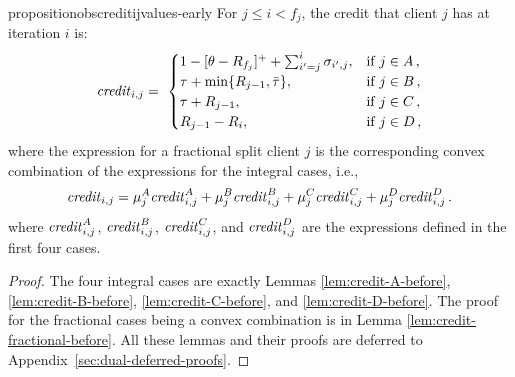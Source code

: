 \begin{restatable}{proposition}{obscreditijvalues-early}\label{prop:credit-ij-values-early}
    For $j \leq i < f_j$, the credit that client $j$ has at iteration $i$ is:
    \begin{equation*}
        \text{\emph{credit}}_{i,j} = 
        \ \begin{cases}
            1 - [\theta - R_{f_j}]^+ + \sum_{i'=j}^i \sigma_{i',j}, 
            & \text{if $j \in A$}\,,\\
            \tau + \min\{R_{j-1},\bar\tau\}, 
            & \text{if $j \in B$}\,,\\
            \tau + R_{j-1}, 
            & \text{if $j \in C$}\,,\\
            R_{j-1} - R_i,
            & \text{if $j \in D$}\,,\\
        \end{cases}
    \end{equation*}
    where the expression for a fractional split client $j$ is the corresponding convex combination of the expressions for the integral cases, i.e.,
    \begin{equation*}
        \text{\emph{credit}}_{i,j}
        = \mu_j^A \text{\emph{credit}}_{i,j}^A
        + \mu_j^B \text{\emph{credit}}_{i,j}^B
        + \mu_j^C \text{\emph{credit}}_{i,j}^C
        + \mu_j^D \text{\emph{credit}}_{i,j}^D\,.
    \end{equation*}
    where $\text{\emph{credit}}_{i,j}^A$, $\text{\emph{credit}}_{i,j}^B$, $\text{\emph{credit}}_{i,j}^C$, and $\text{\emph{credit}}_{i,j}^D$ are the expressions defined in the first four cases.
\end{restatable}
\begin{proof}
The four integral cases are exactly Lemmas \ref{lem:credit-A-before}, \ref{lem:credit-B-before}, \ref{lem:credit-C-before}, and \ref{lem:credit-D-before}. The proof for the fractional cases being a convex combination is in Lemma \ref{lem:credit-fractional-before}. All these lemmas and their proofs are deferred to Appendix~\ref{sec:dual-deferred-proofs}.
\end{proof}

